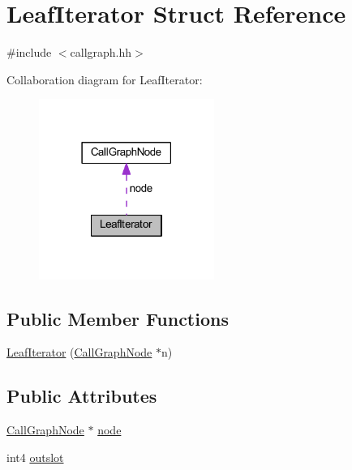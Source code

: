 \hypertarget{struct_leaf_iterator}{}\section{Leaf\+Iterator Struct Reference}
\label{struct_leaf_iterator}


{\ttfamily \#include $<$callgraph.\+hh$>$}



Collaboration diagram for Leaf\+Iterator\+:
\nopagebreak
\begin{figure}[H]
\begin{center}
\leavevmode
\includegraphics[width=162pt]{struct_leaf_iterator__coll__graph}
\end{center}
\end{figure}
\subsection*{Public Member Functions}
\begin{DoxyCompactItemize}
\item 
\mbox{\hyperlink{struct_leaf_iterator_afa74ce29874e23a8da7b78096801b568}{Leaf\+Iterator}} (\mbox{\hyperlink{class_call_graph_node}{Call\+Graph\+Node}} $\ast$n)
\end{DoxyCompactItemize}
\subsection*{Public Attributes}
\begin{DoxyCompactItemize}
\item 
\mbox{\hyperlink{class_call_graph_node}{Call\+Graph\+Node}} $\ast$ \mbox{\hyperlink{struct_leaf_iterator_a50bc8b78fc5fa1d76a08b72689bed13a}{node}}
\item 
int4 \mbox{\hyperlink{struct_leaf_iterator_a88fd53519e3d573cf1a9e2dea0638419}{outslot}}
\end{DoxyCompactItemize}



